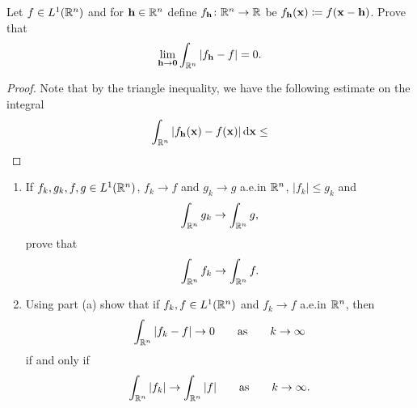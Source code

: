 \begin{problem}
Let $f\in L^1(\mathbb{R}^n)$ and for $\mathbf{h}\in\mathbb{R}^n$ define
$f_{\mathbf{h}}\colon\mathbb{R}^n\to\mathbb{R}$ be $f_{\mathbf{h}}(\mathbf{x})\coloneqq
f(\mathbf{x}-\mathbf{h})$. Prove that
\[
\lim_{\mathbf{h}\to\mathbf{0}}\int_{\mathbb{R}^n}\left|f_{\mathbf{h}}-f\right|=0.
\]
\end{problem}
\begin{proof}
Note that by the triangle inequality, we have the following estimate on the
integral
\begin{equation}
\label{eq:minokwski-estimate-6}
\int_{\mathbb{R}^n}|f_{\mathbf{h}}(\mathbf{x})-f(\mathbf{x})|\mathop{}\!\mathrm{d}\mathbf{x}\leq
\end{equation}

\end{proof}

\begin{problem}
\begin{enumerate}[label=(\alph*)]
\item If $f_k,g_k,f,g\in L^1(\mathbb{R}^n)$, $f_k\to f$ and $g_k\to g$ a.e.\@ in
  $\mathbb{R}^n$, $|f_k|\leq g_k$ and
\[
\int_{\mathbb{R}^n}g_k\to\int_{\mathbb{R}^n}g,
\]
prove that
\[
\int_{\mathbb{R}^n} f_k\to\int_{\mathbb{R}^n}f.
\]
\item Using part (a) show that if $f_k,f\in L^1(\mathbb{R}^n)$ and $f_k\to f$
  a.e.\@ in $\mathbb{R}^n$, then
\[
\int_{\mathbb{R}^n}|f_k-f|\to 0\qquad\text{as}\qquad k\to\infty
\]
if and only if
\[
\int_{\mathbb{R}^n}|f_k|\to\int_{\mathbb{R}^n}|f|\qquad\text{as}\qquad k\to\infty.
\]
\end{enumerate}
\end{problem}
